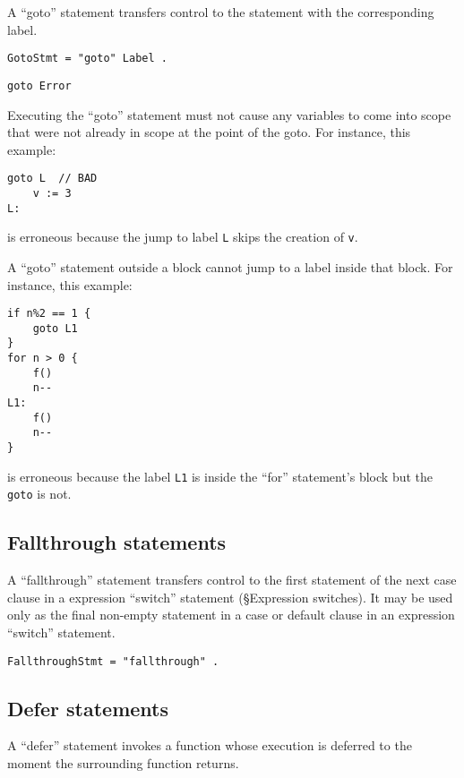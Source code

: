 {A ``goto'' statement transfers control to the statement with the
corresponding label.

\begin{Verbatim}[frame=single]
GotoStmt = "goto" Label .
\end{Verbatim}

\begin{Verbatim}[frame=single]
goto Error
\end{Verbatim}

Executing the ``goto'' statement must not cause any variables to come
into scope that were not already in
scope at the point of the goto. For instance, this example:

\begin{Verbatim}[frame=single]
    goto L  // BAD
    v := 3
L:
\end{Verbatim}

is erroneous because the jump to label \texttt{L} skips the creation of
\texttt{v}.

A ``goto'' statement outside a block cannot jump to a
label inside that block. For instance, this example:

\begin{Verbatim}[frame=single]
if n%2 == 1 {
    goto L1
}
for n > 0 {
    f()
    n--
L1:
    f()
    n--
}
\end{Verbatim}

is erroneous because the label \texttt{L1} is inside the ``for''
statement's block but the \texttt{goto} is not.

\subsection*{Fallthrough statements}

A ``fallthrough'' statement transfers control to the first statement of
the next case clause in a expression ``switch'' statement
(§Expression switches). It may be used
only as the final non-empty statement in a case or default clause in an
expression ``switch'' statement.

\begin{Verbatim}[frame=single]
FallthroughStmt = "fallthrough" .
\end{Verbatim}

\subsection*{Defer statements}

A ``defer'' statement invokes a function whose execution is deferred to
the moment the surrounding function returns.

}
